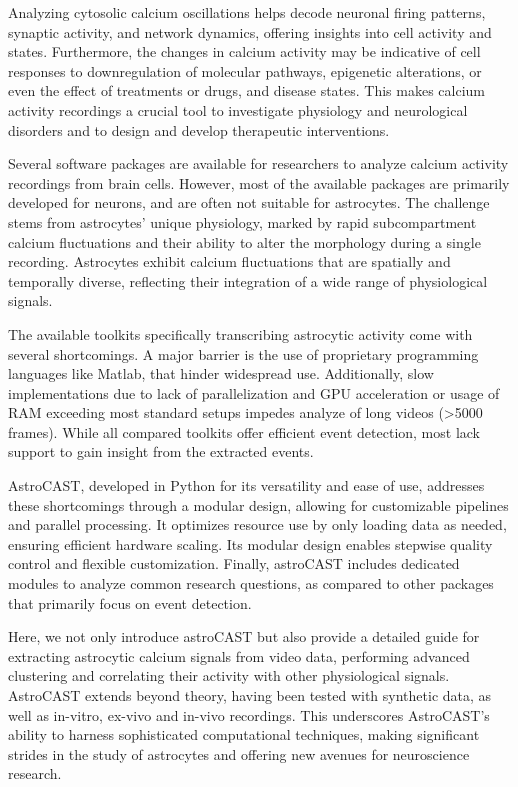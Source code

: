 
Analyzing cytosolic calcium oscillations helps decode neuronal firing patterns, synaptic activity, and network dynamics, offering insights into cell activity and states. Furthermore, the changes in calcium activity may be indicative of cell responses to downregulation of molecular pathways, epigenetic alterations, or even the effect of treatments or drugs, and disease states. This makes calcium activity recordings a crucial tool to investigate physiology and neurological disorders and to design and develop therapeutic interventions.

Several software packages are available for researchers to analyze calcium activity recordings from brain cells. However, most of the available packages are primarily developed for neurons, and are often not suitable for astrocytes. The challenge stems from astrocytes' unique physiology, marked by rapid subcompartment calcium fluctuations and their ability to alter the morphology during a single recording. Astrocytes exhibit calcium fluctuations that are spatially and temporally diverse, reflecting their integration  of a wide range of physiological signals\citep{semyanov_making_2020,smedler_frequency_2014}.

The available toolkits specifically transcribing astrocytic activity come with several shortcomings. A major barrier is the use of proprietary programming languages like Matlab, that hinder widespread use. Additionally, slow implementations due to lack of parallelization and GPU acceleration or usage of RAM exceeding most standard setups impedes analyze of long videos (>5000 frames). While all compared toolkits offer efficient event detection, most lack support to gain insight from the extracted events.

AstroCAST, developed in Python for its versatility and ease of use, addresses these shortcomings through a modular design, allowing for customizable pipelines and parallel processing.  It optimizes resource use by only loading data as needed, ensuring efficient hardware scaling. Its modular design enables stepwise quality control and flexible customization. Finally, astroCAST includes dedicated modules to analyze common research questions, as compared to other packages that primarily focus on event detection.

Here, we not only introduce astroCAST but also provide a detailed guide for extracting astrocytic calcium signals from video data, performing advanced clustering and correlating their activity with other physiological signals. AstroCAST extends beyond theory, having been tested with synthetic data, as well as in-vitro, ex-vivo and in-vivo recordings. This underscores AstroCAST’s ability to harness sophisticated computational techniques, making significant strides in the study of astrocytes and offering new avenues for neuroscience research.
